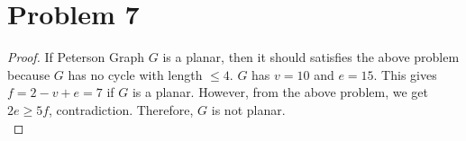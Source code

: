 \section*{Problem 7}
	\begin{proof}
		If Peterson Graph $G$ is a planar, then it should satisfies the above problem because $G$ has no cycle with length $\leq 4$. $G$ has $v = 10$ and $e = 15$. This gives $f = 2 - v + e = 7$ if $G$ is a planar. However, from the above problem, we get $2e \geq 5f$, contradiction. Therefore, $G$ is not planar.\\
	\end{proof}